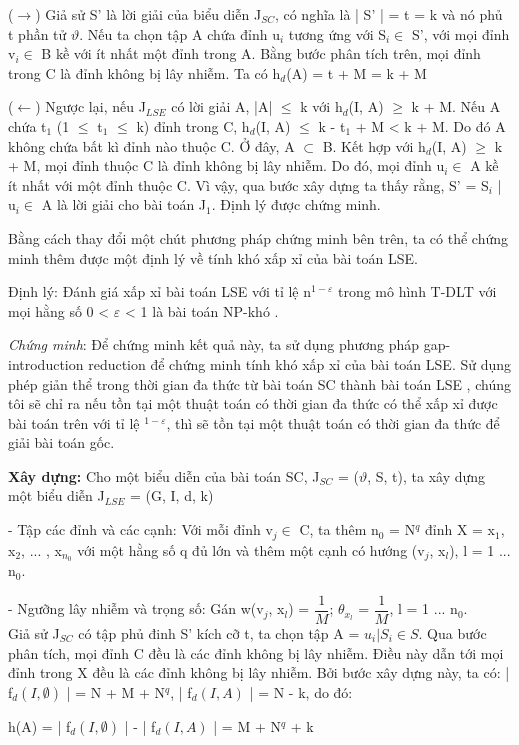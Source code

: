 		($\rightarrow$) Giả sử S' là lời giải của biểu diễn J$_{SC}$, có nghĩa là | S' | = t = k và nó phủ t phần tử $\vartheta$. Nếu ta chọn tập A chứa đỉnh u$_{i}$ tương ứng với S$_{i} \in$ S', với mọi đỉnh v$_{i} \in$ B kề với ít nhất một đỉnh trong A. Bằng bước phân tích trên, mọi đỉnh trong C là đỉnh không bị lây nhiễm. Ta có h$_{d}$(A) = t + M = k + M
 		
 		($\leftarrow$) Ngược lại, nếu J$_{LSE}$ có lời giải A, |A| $\leq$ k với h$_{d}$(I, A) $\geq$ k + M. Nếu A chứa t$_{1}$ (1 $\leq$ t$_{1}$ $\leq$ k) đỉnh trong C, h$_{d}$(I, A) $\leq$ k - t$_{1}$ + M < k + M. Do đó A không chứa bất kì đỉnh nào thuộc C. Ở đây, A $\subset$ B. Kết hợp với h$_{d}$(I, A) $\geq$ k + M, mọi đỉnh thuộc C là đỉnh không bị lây nhiễm. Do đó, mọi đỉnh u$_{i} \in$ A kề ít nhất với một đỉnh thuộc C. Vì vậy, qua bước xây dựng ta thấy rằng, S' = { S$_{i}$ | u$_{i} \in$ A } là lời giải cho bài toán J$_{1}$. Định lý được chứng minh.
 		
 		Bằng cách thay đổi một chút phương pháp chứng minh bên trên, ta có thể chứng minh thêm được một định lý về tính khó xấp xỉ của bài toán LSE.
 		
 		Định lý: Đánh giá xấp xỉ bài toán LSE với tỉ lệ n$^{1 - \varepsilon}$ trong mô hình T-DLT với mọi hằng số 0 < $\varepsilon$ < 1 là bài toán NP-khó .
 		
 		{\itshape Chứng minh}: Để chứng minh kết quả này, ta sử dụng phương pháp gap-introduction reduction \cite{vijay38} để chứng minh tính khó xấp xỉ của bài toán LSE. Sử dụng phép giản thể trong thời gian đa thức từ bài toán SC thành bài toán LSE , chúng tôi sẽ chỉ ra nếu tồn tại một thuật toán có thời gian đa thức có thể xấp xỉ được bài toán trên với tỉ lệ $^{1 - \varepsilon}$, thì sẽ tồn tại một thuật toán có thời gian đa thức để giải bài toán gốc.
 		
 		{\bfseries Xây dựng:} Cho một biểu diễn của bài toán SC, J$_{SC}$ = ($\vartheta$, S, t), ta xây dựng một biểu diễn J$_{LSE}$ = (G, I, d, k) 
 		
 		- Tập các đỉnh và các cạnh: Với mỗi đỉnh v$_{j} \in$ C, ta thêm n$_{0}$ = N$^{q}$ đỉnh X = { x$_{1}$, x$_{2}$, ... , x$_{n_{0}}$} với một hằng số q đủ lớn và thêm một cạnh có hướng (v$_{j}$, x$_{l}$), l = 1 ... n$_{0}$.
 		
 		- Ngưỡng lây nhiễm và trọng số: Gán w(v$_{j}$, x$_{l}$) = $\dfrac{1}{M}$; $\theta_{x_{l}}$ = $\dfrac{1}{M}$, l = 1 ... n$_{0}$.\\
 		
 		Giả sử J$_{SC}$ có tập phủ đinh S' kích cỡ t, ta chọn tập A = ${{u_{i} | S_{i} \in S}}$. Qua bước phân tích, mọi đỉnh C đều là các đỉnh không bị lây nhiễm. Điều này dẫn tới mọi đỉnh trong X đều là các đỉnh không bị lây nhiễm. Bởi bước xây dựng này, ta có: | f$_{d}(I, \emptyset)$ | = N + M + N$^{q}$, | f$_{d}(I, A)$ | = N - k, do đó: 
 		\begin{center}
 			h(A) = | f$_{d}(I, \emptyset)$ | - | f$_{d}(I, A)$ | = M + N$^{q}$ + k
 		\end{center}
 		
